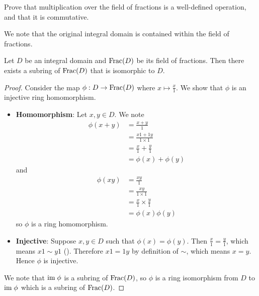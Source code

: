 \begin{exercise}\label{exercise-multiplication-over-field-of-fractions-is-well-defined-and-commutative}
    Prove that multiplication over the field of fractions is a well-defined operation, and that it is commutative.
\end{exercise}

We note that the original integral domain is contained within the field of fractions.

\begin{theorem}\label{thrm-field-of-fractions-contains-integral-domain}
    Let $D$ be an integral domain and $\mathrm{Frac}(D)$ be its field of fractions. Then there exists a subring of $\mathrm{Frac}(D)$ that is isomorphic to $D$.
\end{theorem}
\begin{proof}
    Consider the map $\phi: D \to \mathrm{Frac}(D)$ where $x \mapsto \frac x1$. We show that $\phi$ is an injective ring homomorphism.
    \begin{itemize}
        \item \textbf{Homomorphism}: Let $x, y \in D$. We note
        \begin{align*}
            \phi(x + y) &= \frac{x+y}{1}\\
            &= \frac{x1 + 1y}{1 \times 1}\\
            &= \frac x1 + \frac y1\\
            &= \phi(x) + \phi(y)
        \end{align*}
        and
        \begin{align*}
            \phi(xy) &= \frac{xy}1\\
            &= \frac{xy}{1 \times 1}\\
            &= \frac x1 \times \frac y1\\
            &= \phi(x)\phi(y)
        \end{align*}
        so $\phi$ is a ring homomorphism.

        \item \textbf{Injective}: Suppose $x, y \in D$ such that $\phi(x) = \phi(y)$. Then $\frac x1 = \frac y1$, which means $x1 \mathrel{\sim} y1$ (). Therefore $x1 = 1y$ by definition of $\sim$, which means $x = y$. Hence $\phi$ is injective.
    \end{itemize}
    We note that $\mathrm{im}\; \phi$ is a subring of $\mathrm{Frac}(D)$, so $\phi$ is a ring isomorphism from $D$ to $\mathrm{im}\; \phi$ which is a subring of $\mathrm{Frac}(D)$.
\end{proof}

